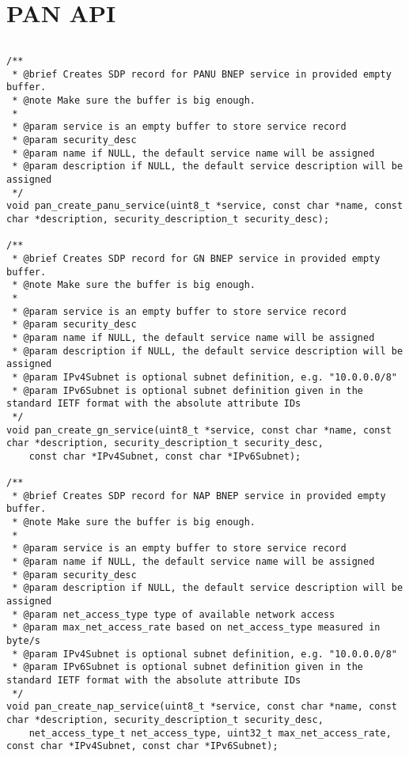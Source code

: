 \section{PAN API}
\label{appendix:api_pan}
$ $
\begin{lstlisting}
/** 
 * @brief Creates SDP record for PANU BNEP service in provided empty buffer.
 * @note Make sure the buffer is big enough.
 *
 * @param service is an empty buffer to store service record
 * @param security_desc 
 * @param name if NULL, the default service name will be assigned
 * @param description if NULL, the default service description will be assigned
 */
void pan_create_panu_service(uint8_t *service, const char *name, const char *description, security_description_t security_desc);

/** 
 * @brief Creates SDP record for GN BNEP service in provided empty buffer.
 * @note Make sure the buffer is big enough.
 *
 * @param service is an empty buffer to store service record
 * @param security_desc 
 * @param name if NULL, the default service name will be assigned
 * @param description if NULL, the default service description will be assigned
 * @param IPv4Subnet is optional subnet definition, e.g. "10.0.0.0/8"
 * @param IPv6Subnet is optional subnet definition given in the standard IETF format with the absolute attribute IDs
 */
void pan_create_gn_service(uint8_t *service, const char *name, const char *description, security_description_t security_desc, 
	const char *IPv4Subnet, const char *IPv6Subnet);

/** 
 * @brief Creates SDP record for NAP BNEP service in provided empty buffer.
 * @note Make sure the buffer is big enough.
 *
 * @param service is an empty buffer to store service record
 * @param name if NULL, the default service name will be assigned
 * @param security_desc 
 * @param description if NULL, the default service description will be assigned
 * @param net_access_type type of available network access
 * @param max_net_access_rate based on net_access_type measured in byte/s
 * @param IPv4Subnet is optional subnet definition, e.g. "10.0.0.0/8"
 * @param IPv6Subnet is optional subnet definition given in the standard IETF format with the absolute attribute IDs
 */
void pan_create_nap_service(uint8_t *service, const char *name, const char *description, security_description_t security_desc, 
	net_access_type_t net_access_type, uint32_t max_net_access_rate, const char *IPv4Subnet, const char *IPv6Subnet);
\end{lstlisting}
\pagebreak

